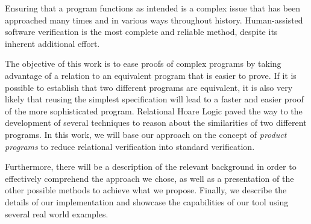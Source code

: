 

Ensuring that a program functions as intended is a complex issue that has been approached many times and in various ways throughout history.
Human-assisted software verification is the most complete and reliable method, despite its inherent additional effort.

The objective of this work is to ease proofs of complex programs by taking advantage of a relation to an equivalent program that is easier to prove.
If it is possible to establish that two different programs are equivalent, it is also very likely that reusing the simplest specification will lead to a faster and easier proof of the more sophisticated program.
Relational Hoare Logic paved the way to the development of several techniques to reason about the similarities of two different programs.
In this work, we will base our approach on the concept of \emph{product programs} to reduce relational verification into standard verification.

Furthermore, there will be a description of the relevant background in order to effectively comprehend the approach we chose, as well as a presentation of the other possible methods to achieve what we propose.
Finally, we describe the details of our implementation and showcase the capabilities of our tool using several real world examples.


